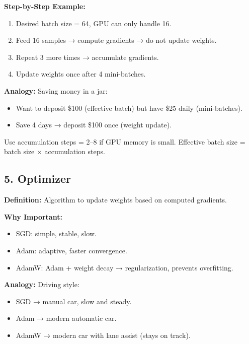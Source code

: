 \documentclass[a4paper, 12pt]{article}
\begin{document}
\textbf{Step-by-Step Example:}
\begin{enumerate}
    \item Desired batch size = 64, GPU can only handle 16.  
    \item Feed 16 samples → compute gradients → do not update weights.  
    \item Repeat 3 more times → accumulate gradients.  
    \item Update weights once after 4 mini-batches.  
\end{enumerate}

\textbf{Analogy:} Saving money in a jar:  
\begin{itemize}
    \item Want to deposit \$100 (effective batch) but have \$25 daily (mini-batches).  
    \item Save 4 days → deposit \$100 once (weight update).  
\end{itemize}

\begin{tcolorbox}[colback=purple!5,colframe=purple!70!black,title=Rule of Thumb]
Use accumulation steps = 2--8 if GPU memory is small.  
Effective batch size = batch size $\times$ accumulation steps.
\end{tcolorbox}



\subsection*{5. Optimizer}
\textbf{Definition:} Algorithm to update weights based on computed gradients.  

\textbf{Why Important:}  
\begin{itemize}
    \item SGD: simple, stable, slow.  
    \item Adam: adaptive, faster convergence.  
    \item AdamW: Adam + weight decay → regularization, prevents overfitting.  
\end{itemize}

\textbf{Analogy:} Driving style:  
\begin{itemize}
    \item SGD → manual car, slow and steady.  
    \item Adam → modern automatic car.  
    \item AdamW → modern car with lane assist (stays on track).  
\end{itemize}
\end{document}
